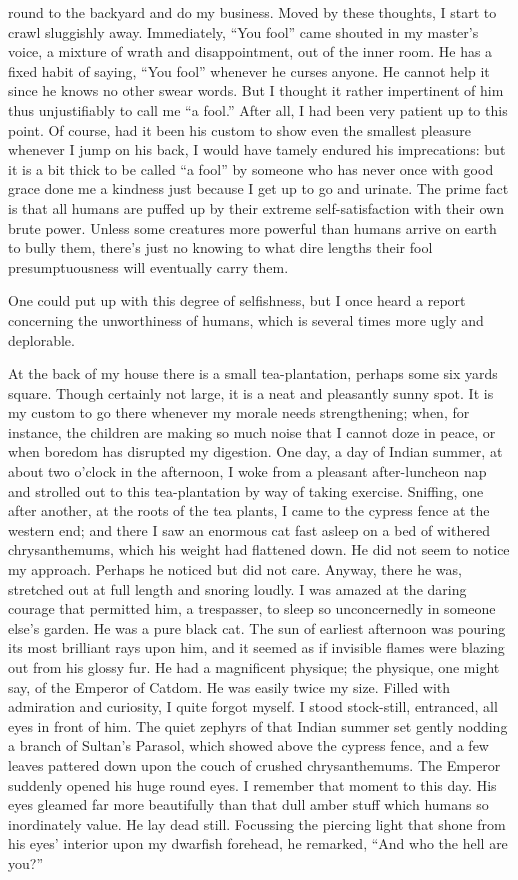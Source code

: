 \documentclass[12pt, openright]{book}
\begin{document}
round to the backyard and do my business. Moved by these thoughts, I
start to crawl sluggishly away. Immediately, ``You fool'' came shouted
in my master's voice, a mixture of wrath and disappointment, out of the
inner room. He has a fixed habit of saying, ``You fool'' whenever he
curses anyone. He cannot help it since he knows no other swear words.
But I thought it rather impertinent of him thus unjustifiably to call me
``a fool.'' After all, I had been very patient up to this point. Of
course, had it been his custom to show even the smallest pleasure
whenever I jump on his back, I would have tamely endured his
imprecations: but it is a bit thick to be called ``a fool'' by someone
who has never once with good grace done me a kindness just because I get
up to go and urinate. The prime fact is that all humans are puffed up by
their extreme self-satisfaction with their own brute power. Unless some
creatures more powerful than humans arrive on earth to bully them,
there's just no knowing to what dire lengths their fool presumptuousness
will eventually carry them.

One could put up with this degree of selfishness, but I once heard a
report concerning the unworthiness of humans, which is several times
more ugly and deplorable.

At the back of my house there is a small tea-plantation, perhaps some
six yards square. Though certainly not large, it is a neat and
pleasantly sunny spot. It is my custom to go there whenever my morale
needs strengthening; when, for instance, the children are making so much
noise that I cannot doze in peace, or when boredom has disrupted my
digestion. One day, a day of Indian summer, at about two o'clock in the
afternoon, I woke from a pleasant after-luncheon nap and strolled out to
this tea-plantation by way of taking exercise. Sniffing, one after
another, at the roots of the tea plants, I came to the cypress fence at
the western end; and there I saw an enormous cat fast asleep on a bed of
withered chrysanthemums, which his weight had flattened down. He did not
seem to notice my approach. Perhaps he noticed but did not care. Anyway,
there he was, stretched out at full length and snoring loudly. I was
amazed at the daring courage that permitted him, a trespasser, to sleep
so unconcernedly in someone else's garden. He was a pure black cat. The
sun of earliest afternoon was pouring its most brilliant rays upon him,
and it seemed as if invisible flames were blazing out from his glossy
fur. He had a magnificent physique; the physique, one might say, of the
Emperor of Catdom. He was easily twice my size. Filled with admiration
and curiosity, I quite forgot myself. I stood stock-still, entranced,
all eyes in front of him. The quiet zephyrs of that Indian summer set
gently nodding a branch of Sultan's Parasol, which showed above the
cypress fence, and a few leaves pattered down upon the couch of crushed
chrysanthemums. The Emperor suddenly opened his huge round eyes. I
remember that moment to this day. His eyes gleamed far more beautifully
than that dull amber stuff which humans so inordinately value. He lay
dead still. Focussing the piercing light that shone from his eyes'
interior upon my dwarfish forehead, he remarked, ``And who the hell are
you?''
\end{document}
